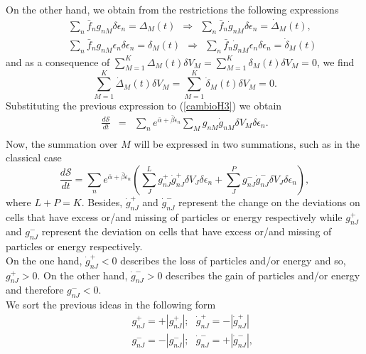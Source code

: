 \documentclass{article}
\newcommand{\de}{\delta}
\newcommand{\Ss}{\mathcal{S}}
\begin{document}
On the other hand, we obtain from the restrictions the following expressions
\begin{eqnarray}
    &&\sum_n \bar{f}_n g_{nM} \delta \epsilon_n=\Delta_M(t) \ \  \Rightarrow \ \  \sum_n \bar{f}_n \dot{g}_{nM} \delta \epsilon_n=\dot{\Delta}_M(t), \nonumber \\
    &&\sum_n  \bar{f}_n g_{nM}\epsilon_n \delta \epsilon_n=\delta_M(t) \ \  \Rightarrow \ \  \sum_n \bar{f}_n \dot{g}_{nM}\epsilon_n \delta \epsilon_n=\dot{\delta}_M(t)
\end{eqnarray}{}
and as a consequence of $\sum_{M=1}^{K} \Delta_M(t) \de V_M  =\sum_{M=1}^{K} \delta_M(t) \de V_M =0$, we find
\begin{equation}
    \sum_{M=1}^{K} \dot{\Delta}_M(t) \de V_M =\sum_{M=1}^{K} \dot{\delta}_{M}(t) \de V_M=0.
\end{equation}{}
Substituting the previous expression to (\ref{cambioH3}) we obtain
\begin{eqnarray}
   \frac{d\Ss}{dt}&=&  \sum_n e^{\bar{\alpha}+\bar{\beta}\epsilon_n}\sum_M  g_{nM}\dot{g}_{nM} \de V_M\delta \epsilon_n. \nonumber \\ \label{cambioH4}
\end{eqnarray}{}
Now, the summation over $M$ will be expressed in two summations, such as in the classical case
\begin{equation}
    \frac{d\Ss}{dt}=\sum_n  e^{\bar{\alpha}+\bar{\beta}\epsilon_n}\left(\sum_J ^{L} g^{+}_{nJ}\dot{g}^{+}_{nJ}\de V_J \delta \epsilon_n+\sum^{P}_J  g^{-}_{nJ}\dot{g}^{-}_{nJ} \de V_J\delta \epsilon_n \right), \label{cambioH5}
\end{equation}{}
where $L+P=K$. Besides, $\dot{g}^{+}_{nJ}$ and $\dot{g}^{-}_{nJ}$  represent the change on the deviations on cells that have excess or/and missing of particles or energy respectively while $g^{+}_{nJ}$ and $g^{-}_{nJ}$ represent the deviation on cells that have excess or/and missing of particles or energy respectively.\\
On the one hand, $\dot{g}^{+}_{nJ}<0$ describes the loss of particles and/or energy and so, $g^{+}_{nJ}>0$. On the other hand, $\dot{g}^{-}_{nJ}>0$ describes the gain of particles and/or energy and therefore $g^{-}_{nJ}<0$. \\
We sort the previous ideas in the following form
\begin{eqnarray}
   &&g^{+}_{nJ}=+|g^{+}_{nJ}|; \ \ \  \dot{g}^{+}_{nJ}=-|\dot{g}^{+}_{nJ}| \nonumber \\
   &&g^{-}_{nJ}=-|g^{-}_{nJ}|; \ \ \ \dot{g}^{-}_{nJ}=+|\dot{g}^{-}_{nJ}| \label{separacion},
\end{eqnarray}{}
\end{document}
